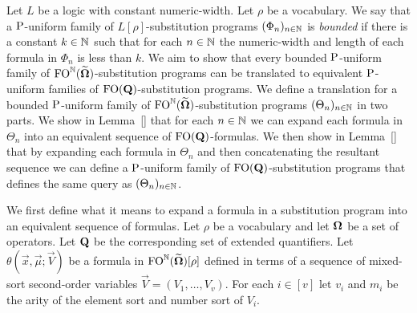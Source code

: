 \documentclass[../main/thesis.tex]{subfiles}
\begin{document}


Let $L$ be a logic with constant numeric-width. Let $\rho$ be a vocabulary. We
say that a $\mathrm{P}$-uniform family of $L[\rho]$-substitution programs $(\Phi_n)_{n
  \in \mathbb{N}}$ is \emph{bounded} if there is a constant $k \in \mathbb{N}$ such that
for each $n \in \mathbb{N}$ the numeric-width and length of each formula in $\Phi_n$
is less than $k$. We aim to show that every bounded $\mathrm{P}$-uniform family of
$\text{\upshape FO}^{\mathbb{N}} (\widetilde{\mathbf{\mathbf{\Omega}}})$-substitution programs can be translated to
equivalent $\mathrm{P}$-uniform families of $\text{\upshape FO}(\mathbf{Q})$-substitution programs. We
define a translation for a bounded $\mathrm{P}$-uniform family of
$\text{\upshape FO}^{\mathbb{N}} (\widetilde{\mathbf{\mathbf{\Omega}}})$-substitution programs $(\Theta_n)_{n \in \mathbb{N}}$
in two parts. We show in Lemma~\ref{} that for each $n \in \mathbb{N}$ we can expand
each formula in $\Theta_n$ into an equivalent sequence of
$\text{\upshape FO}(\mathbf{Q})$-formulas. We then show in Lemma~\ref{} that by expanding each
formula in $\Theta_n$ and then concatenating the resultant sequence we can
define a $\mathrm{P}$-uniform family of $\text{\upshape FO}(\mathbf{Q})$-substitution programs that
defines the same query as $(\Theta_n)_{n \in \mathbb{N}}$.

We first define what it means to expand a formula in a substitution program into
an equivalent sequence of formulas. Let $\rho$ be a vocabulary and let $\mathbf{\mathbf{\Omega}}$
be a set of operators. Let $\mathbf{Q}$ be the corresponding set of extended
quantifiers. Let $\theta (\vec{x}, \vec{\mu}; \vec{V})$ be a formula in
$\text{\upshape FO}^{\mathbb{N}} (\widetilde{\mathbf{\mathbf{\Omega}}})[\rho]$ defined in terms of a sequence of
mixed-sort second-order variables $\vec{V} = (V_1, \ldots, V_v)$. For each $i
\in [v]$ let $v_i$ and $m_i$ be the arity of the element sort and number sort of
$V_i$.
\end{document}
